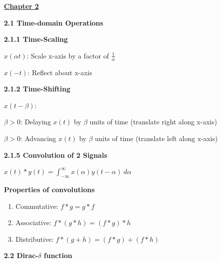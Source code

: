 \documentclass[landscape,a4paper]{extarticle}
\begin{document}
\begin{multicols*}{5}
    \textbf{\uline{Chapter 2}}

    \textbf{2.1 Time-domain Operations}

    \textbf{2.1.1 Time-Scaling}

    $x(\alpha t)$: Scale x-axis by a factor of $\frac{1}{\alpha}$

    $x(-t)$: Reflect about x-axis

    \textbf{2.1.2 Time-Shifting}

    $x(t-\beta)$:

    $\beta > 0$: Delaying $x(t)$ by $\beta$ units of time (translate right along x-axis)

    $\beta > 0$: Advancing $x(t)$ by $\beta$ units of time (translate left along x-axis)

    \textbf{2.1.5 Convolution of 2 Signals}

    $x(t)*y(t)=\int_{-\infty}^{\infty}x(\alpha)y(t-\alpha)\ d\alpha$

    \textbf{Properties of convolutions}
    \begin{enumerate}
        \item Commutative: $f * g = g * f$
        \item Associative: $f * (g * h) = (f * g) * h$
        \item Distributive: $f * (g + h) = (f * g) + (f * h)$
    \end{enumerate}

    \textbf{2.2 Dirac-$\delta$ function}


\end{multicols*}
\end{document}

